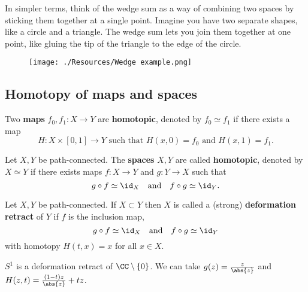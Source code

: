 \documentclass[12pt, a4paper]{article}
\begin{document}
\begin{mdnote}
    In simpler terms, think of the wedge sum as a way of combining two spaces by sticking them together at a single point. Imagine you have two separate shapes, like a circle and a triangle. The wedge sum lets you join them together at one point, like gluing the tip of the triangle to the edge of the circle.
\end{mdnote}

\begin{mdexample}
    \begin{figure}[H]
         \begin{center}
             \texttt{[image: ./Resources/Wedge example.png]}
         \end{center}
    \end{figure}
\end{mdexample}

\subsection{Homotopy of maps and spaces}

\begin{definition}
    Two \textbf{maps} \(f_0,f_1 : X\to Y\) are \textbf{homotopic}, denoted by \(f_0 \simeq f_1\) if there exists a map 
    \[H:X \times [0,1] \to Y \text{ such that \(H(x,0)=f_0\) and \(H(x,1)=f_1\).}\]
\end{definition}

\begin{definition}
    Let \(X,Y\) be path-connected. The \textbf{spaces} \(X,Y\) are called \textbf{homotopic}, denoted by \(X \simeq Y\) if there exists maps \(f:X \to Y\) and \(g : Y\to X\) such that 
    \[g \circ f \simeq \id_X \quad \text{and} \quad f\circ g \simeq \id_Y.\]
\end{definition}

\begin{definition}
    Let \(X,Y\) be path-connected. If \(X \subset Y\) then \(X\) is called a (strong) \textbf{deformation retract} of \(Y\) if \(f\) is the inclusion map, 
    \[g\circ f \simeq \id_X \quad \text{and} \quad f \circ g \simeq \id_Y\]
    with homotopy \(H(t,x)=x\) for all \(x \in X\).
\end{definition}

\begin{mdexample}
    \(S^1\) is a deformation retract of \(\CC\setminus \left\{ 0 \right\}\). We can take \(g(z)=\frac{z}{\abs{z}}\) and \(H(z,t)=\frac{(1-t) z}{\abs{z}}+tz\).
\end{mdexample}
\end{document}
